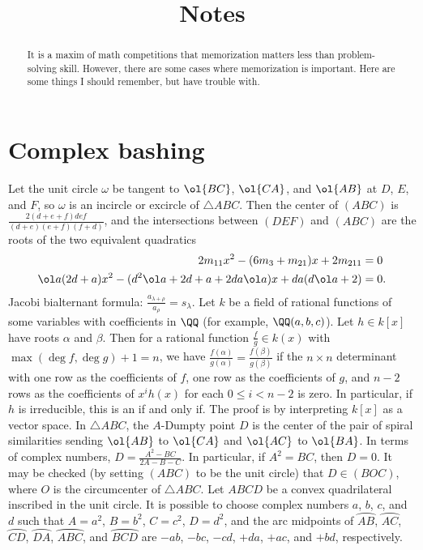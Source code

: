 \documentclass[11pt]{scrartcl}
\title{Notes}
\begin{document}
\maketitle

\begin{abstract}
    It is a maxim of math competitions that memorization matters less than problem-solving skill. However, there are some cases where memorization is important. Here are some things I should remember, but have trouble with.
\end{abstract}

\section{Complex bashing}

\begin{itemize}
    \ii Let the unit circle $\omega$ be tangent to $\ol{BC}$, $\ol{CA}$, and $\ol{AB}$ at $D$, $E$, and $F$, so $\omega$ is an incircle or excircle of $\triangle ABC$. Then the center of $(ABC)$ is $\frac{2(d + e + f)def}{(d + e)(e + f)(f + d)}$, and the intersections between $(DEF)$ and $(ABC)$ are the roots of the two equivalent quadratics
    \begin{align*}
        2m_{11}x^2 - (6m_3 + m_{21})x + 2m_{211} &= 0 \\
        \ol a(2d + a)x^2 - (d^2\ol a + 2d + a + 2da\ol a)x + da(d\ol a + 2) &= 0.
    \end{align*}
    \ii Jacobi bialternant formula: $\frac{a_{\lambda + \rho}}{a_\rho} = s_\lambda$.
    \ii Let $k$ be a field of rational functions of some variables with coefficients in $\QQ$ (for example, $\QQ(a,b,c)$). Let $h \in k[x]$ have roots $\alpha$ and $\beta$. Then for a rational function $\frac fg \in k(x)$ with $\max(\deg f,\deg g) + 1 = n$, we have $\frac{f(\alpha)}{g(\alpha)} = \frac{f(\beta)}{g(\beta)}$ if the $n \times n$ determinant with one row as the coefficients of $f$, one row as the coefficients of $g$, and $n - 2$ rows as the coefficients of $x^ih(x)$ for each $0 \le i < n - 2$ is zero. In particular, if $h$ is irreducible, this is an if and only if. The proof is by interpreting $k[x]$ as a vector space.
    \ii In $\triangle ABC$, the $A$-Dumpty point $D$ is the center of the pair of spiral similarities sending $\ol{AB}$ to $\ol{CA}$ and $\ol{AC}$ to $\ol{BA}$. In terms of complex numbers, $D = \frac{A^2 - BC}{2A - B - C}$. In particular, if $A^2 = BC$, then $D = 0$. It may be checked (by setting $(ABC)$ to be the unit circle) that $D \in (BOC)$, where $O$ is the circumcenter of $\triangle ABC$.
    \ii Let $ABCD$ be a convex quadrilateral inscribed in the unit circle. It is possible to choose complex numbers $a$, $b$, $c$, and $d$ such that $A = a^2$, $B = b^2$, $C = c^2$, $D = d^2$, and the arc midpoints of $\wideparen{AB}$, $\wideparen{AC}$, $\wideparen{CD}$, $\wideparen{DA}$, $\wideparen{ABC}$, and $\wideparen{BCD}$ are $-ab$, $-bc$, $-cd$, $+da$, $+ac$, and $+bd$, respectively.
\end{itemize}
\end{document}
